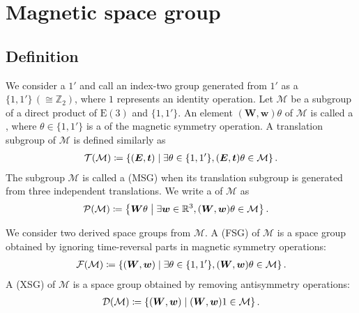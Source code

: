 \section{\label{sec:msg}Magnetic space group}

\subsection{Definition}

We consider a  $1'$ and call an index-two group generated from $1'$ as a  $\{ 1, 1' \} \, (\cong \mathbb{Z}_{2})$, where $1$ represents an identity operation.
Let $\mathcal{M}$ be a subgroup of a direct product of $\mathrm{E}(3)$ and $\{ 1, 1' \}$.
An element $(\bm{W}, \bm{w})\theta$ of $\mathcal{M}$ is called a , where $\theta \in \{ 1, 1' \}$ is a  of the magnetic symmetry operation.
A translation subgroup of $\mathcal{M}$ is defined similarly as
\begin{align}
  \mathcal{T}(\mathcal{M}) \coloneqq \left\{  (\bm{E}, \bm{t})  \mathrel{}\middle|\mathrel{}  \exists \theta \in \{ 1, 1' \}, (\bm{E}, \bm{t})\theta \in \mathcal{M}  \right\}.
\end{align}
The subgroup $\mathcal{M}$ is called a  (MSG) when its translation subgroup is generated from three independent translations.
We write a  of $\mathcal{M}$ as
\begin{align}
    \mathcal{P}(\mathcal{M})
        &\coloneqq \left\{  \bm{W}\theta  \mathrel{}\middle|\mathrel{}  \exists \bm{w} \in \mathbb{R}^{3}, (\bm{W}, \bm{w})\theta \in \mathcal{M}  \right\}.
\end{align}

We consider two derived space groups from $\mathcal{M}$.
A  (FSG) of $\mathcal{M}$ is a space group obtained by ignoring time-reversal parts in magnetic symmetry operations:
\begin{align}
    \mathcal{F}(\mathcal{M}) \coloneqq \left\{  (\bm{W}, \bm{w})  \mathrel{}\middle|\mathrel{}  \exists \theta \in \{ 1, 1' \}, (\bm{W}, \bm{w})\theta \in \mathcal{M}  \right\}.
\end{align}
A  (XSG) of $\mathcal{M}$ is a space group obtained by removing antisymmetry operations:
\begin{align}
    \mathcal{D}(\mathcal{M}) \coloneqq \left\{  (\bm{W}, \bm{w})  \mathrel{}\middle|\mathrel{}  (\bm{W}, \bm{w})1 \in \mathcal{M}  \right\}.
\end{align}


